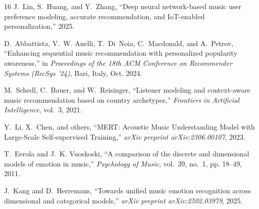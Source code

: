 \begin{thebibliography}{16}
J.~Lin, S.~Huang, and Y.~Zhang,
``Deep neural network-based music user preference modeling, accurate recommendation, and IoT-enabled personalization,''
2025.

D.~Abbattista, V.~W. Anelli, T.~Di~Noia, C.~Macdonald, and A.~Petrov, ``Enhancing sequential music recommendation with personalized popularity awareness,'' in \emph{Proceedings of the 18th ACM Conference on Recommender Systems (RecSys '24)}, Bari, Italy, Oct. 2024.

M.~Schedl, C.~Bauer, and W.~Reisinger, ``Listener modeling and context-aware music recommendation based on country archetypes,'' \emph{Frontiers in Artificial Intelligence}, vol.~3, 2021.

Y.~Li, X.~Chen, and others, ``MERT: Acoustic Music Understanding Model with Large-Scale Self-supervised Training,'' \emph{arXiv preprint arXiv:2306.00107}, 2023.

T.~Eerola and J.~K. Vuoskoski, ``A comparison of the discrete and dimensional models of emotion in music,'' \emph{Psychology of Music}, vol.~39, no.~1, pp. 18--49, 2011.

J.~Kang and D.~Herremans, ``Towards unified music emotion recognition across dimensional and categorical models,'' \emph{arXiv preprint arXiv:2502.03979}, 2025.

\end{thebibliography}
